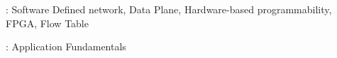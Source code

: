 
\vspace{\baselineskip}
: Software Defined network, Data Plane, Hardware-based programmability, FPGA, Flow Table



\vspace{\baselineskip}
: Application Fundamentals

\clearpage
